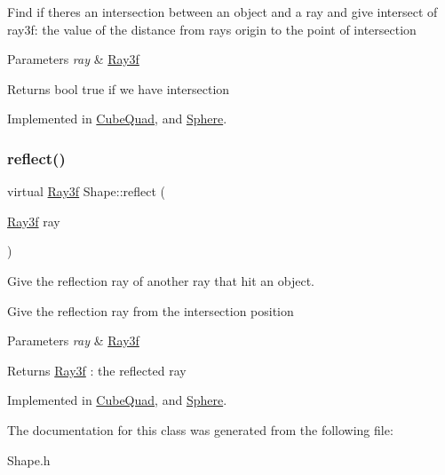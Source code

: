 Find if there\textquotesingle{}s an intersection between an object and a ray and give intersect of ray3f\+: the value of the distance from ray\textquotesingle{}s origin to the point of intersection 
\begin{DoxyParams}{Parameters}
{\em ray} & \mbox{\hyperlink{class_ray3f}{Ray3f}} \\
\hline
\end{DoxyParams}
\begin{DoxyReturn}{Returns}
bool true if we have intersection 
\end{DoxyReturn}


Implemented in \mbox{\hyperlink{class_cube_quad_a8d55228ceeed7ce319bc6d8fe8f6b67f}{Cube\+Quad}}, and \mbox{\hyperlink{class_sphere_a29e5c6f306c166c59b5d462205177f27}{Sphere}}.

\mbox{\label{class_shape_a7cc30a4c8e9564c51f6ab36554aa5cfc}} 
\subsubsection{\texorpdfstring{reflect()}{reflect()}}
{\footnotesize\ttfamily virtual \mbox{\hyperlink{class_ray3f}{Ray3f}} Shape\+::reflect (\begin{DoxyParamCaption}\item[{\mbox{\hyperlink{class_ray3f}{Ray3f}}}]{ray }\end{DoxyParamCaption})\hspace{0.3cm}{\ttfamily [pure virtual]}}



Give the reflection ray of another ray that hit an object. 

Give the reflection ray from the intersection position 
\begin{DoxyParams}{Parameters}
{\em ray} & \mbox{\hyperlink{class_ray3f}{Ray3f}} \\
\hline
\end{DoxyParams}
\begin{DoxyReturn}{Returns}
\mbox{\hyperlink{class_ray3f}{Ray3f}} \+: the reflected ray 
\end{DoxyReturn}


Implemented in \mbox{\hyperlink{class_cube_quad_a18ef5943f0cfd8b9b72950211691314a}{Cube\+Quad}}, and \mbox{\hyperlink{class_sphere_a4ba50719ce557c0ff9a85333d0524bad}{Sphere}}.



The documentation for this class was generated from the following file\+:\begin{DoxyCompactItemize}
\item 
Shape.\+h\end{DoxyCompactItemize}
